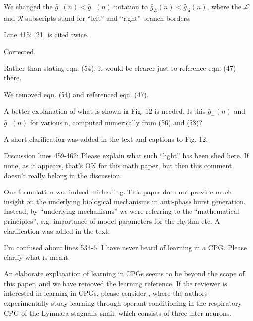 \documentclass{ar2rc}
\begin{document}
\AR
We changed the $\bar{g}_{+}(n) < \bar{g}_{-}(n)$ notation to $\bar{g}_{\mathcal{L}}(n) < \bar{g}_{\mathcal{R}}(n)$, where the $\mathcal{L}$ and $\mathcal{R}$ subscripts stand for ``left'' and ``right'' branch borders.

\RC
Line 415: [21] is cited twice.

\AR
Corrected.

\RC
Rather than stating eqn. (54), it would be clearer just to reference eqn. (47) there.

\AR
We removed eqn. (54) and referenced eqn. (47).

\RC
A better explanation of what is shown in Fig. 12 is needed. Is this $\bar{g}_{+}(n)$ and $\bar{g}_{-}(n)$ for various n, computed numerically from (56) and (58)?

\AR
A short clarification was added in the text and captions to Fig. 12.

\RC
Discussion lines 459-462: Please explain what such “light” has been shed here. If none, as it appears, that’s OK for this math paper, but then this comment doesn’t really belong in the discussion.

\AR
Our formulation was indeed misleading. This paper does not provide much insight on the underlying biological mechanisms in anti-phase burst generation. Instead, by ``underlying mechanisms'' we were referring to the ``mathematical principles'', e.g. importance of model parameters for the rhythm etc. A clarification was added in the text.

\RC
I’m confused about lines 534-6. I have never heard of learning in a CPG. Please clarify what is meant.

\AR
An elaborate explanation of learning in CPGs seems to be beyond the scope of this paper, and we have removed the learning reference. If the reviewer is interested in learning in CPGs, please consider \citet{lukowiak1999}, where the authors experimentally study learning through operant conditioning in the respiratory CPG of the Lymnaea stagnalis snail, which consists of three inter-neurons.



\end{document}
